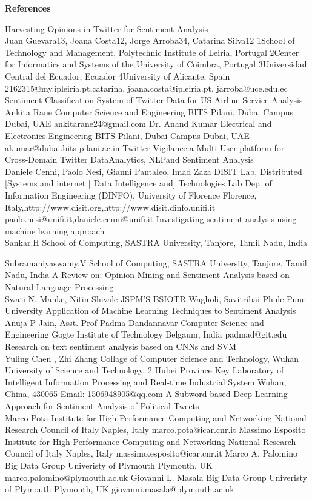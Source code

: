 \documentclass[preprint,12pt]{elsarticle}
\begin{document}
\textbf{References}
\begin{thebibliography}{1}
Harvesting Opinions in Twitter  for Sentiment Analysis \\
Juan Guevara13, Joana Costa12, Jorge Arroba34, Catarina Silva12 1School of Technology and Management, Polytechnic Institute of Leiria, Portugal 2Center for Informatics and Systems of the University of Coimbra, Portugal 3Universidad Central del Ecuador, Ecuador 4University of Alicante, Spain 2162315@my.ipleiria.pt,{catarina, joana.costa}@ipleiria.pt, jarroba@uce.edu.ec 
\bibitem{}
Sentiment Classification System of Twitter Data for US Airline Service Analysis\\
Ankita Rane Computer Science and Engineering BITS Pilani, Dubai Campus Dubai, UAE ankitarane24@gmail.com
Dr. Anand Kumar Electrical and Electronics Engineering BITS Pilani, Dubai Campus Dubai, UAE akumar@dubai.bits-pilani.ac.in
\bibitem{}
Twitter Vigilance:a Multi-User platform for Cross-Domain Twitter DataAnalytics, NLPand Sentiment Analysis \\
Daniele Cenni, Paolo Nesi, Gianni Pantaleo, Imad Zaza DISIT Lab, Distributed [Systems and internet | Data Intelligence and] Technologies Lab Dep. of Information Engineering (DINFO), University of Florence Florence, Italy,http://www.disit.org,http://www.disit.dinfo.unifi.it paolo.nesi@unifi.it,daniele.cenni@unifi.it
\bibitem{}
Investigating sentiment analysis using machine learning approach\\
Sankar.H
School of Computing,
SASTRA University,
Tanjore, Tamil Nadu, India

Subramaniyaswamy.V
School of Computing,
SASTRA University,
Tanjore, Tamil Nadu, India
\bibitem{}
A Review on: Opinion Mining and Sentiment Analysis based on Natural Language Processing\\
Swati N. Manke, Nitin Shivale JSPM’S BSIOTR Wagholi, Savitribai Phule Pune University
\bibitem{}
Application of Machine Learning Techniques to Sentiment Analysis\\
Anuja P Jain, Asst. Prof Padma Dandannavar
Computer Science and Engineering
Gogte Institute of Technology
Belgaum, India
padmad@git.edu
\bibitem{}
Research on text sentiment analysis based on CNNs and SVM\\
Yuling Chen , Zhi Zhang
Collage of Computer Science and Technology,
Wuhan University of Science and Technology, 2
Hubei Province Key Laboratory of Intelligent Information
Processing and Real-time Industrial System
Wuhan, China, 430065
Email: 1506948905@qq.com
\bibitem{}
A Subword-based Deep Learning Approach for Sentiment Analysis of Political Tweets \\
Marco Pota Institute for High Performance Computing and Networking National Research Council of Italy Naples, Italy marco.pota@icar.cnr.it 
Massimo Esposito Institute for High Performance Computing and Networking National Research Council of Italy Naples, Italy massimo.esposito@icar.cnr.it 
Marco A. Palomino Big Data Group Univeristy of Plymouth Plymouth, UK marco.palomino@plymouth.ac.uk 
Giovanni L. Masala Big Data Group Univeristy of Plymouth Plymouth, UK giovanni.masala@plymouth.ac.uk
 
\end{thebibliography}
\end{document}
